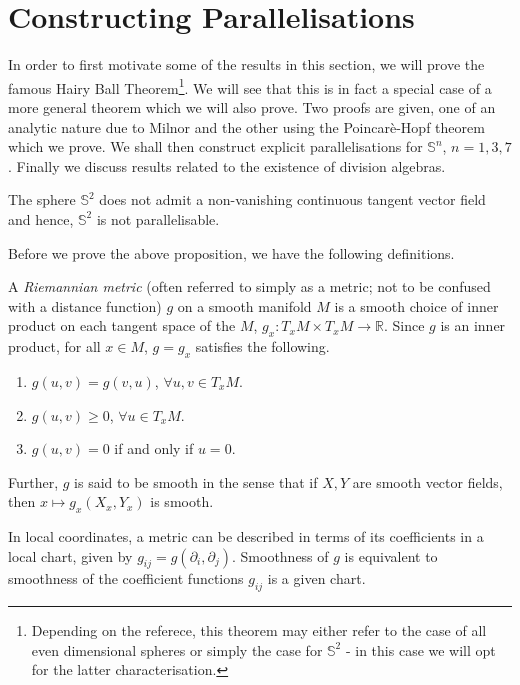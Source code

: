 \section{Constructing Parallelisations}
In order to first motivate some of the results in this section, we will prove the famous Hairy Ball Theorem\footnote{Depending on the referece, this theorem may either refer to the case of all even dimensional spheres or simply the case for $\mathbb{S}^2$ - in this case we will opt for the latter characterisation.}. We will see that this is in fact a special case of a more general theorem which we will also prove. Two proofs are given, one of an analytic nature due to Milnor \cite{MR505523} and the other using the Poincar\`{e}-Hopf theorem which we prove.
We shall then construct explicit parallelisations for $\mathbb{S}^n$, $n=1,3,7$. Finally we discuss results related to the existence of division algebras.
 
\begin{proposition}
The sphere $\mathbb{S}^2$ does not admit a non-vanishing continuous tangent vector field and hence, $\mathbb{S}^2$ is not parallelisable.
\end{proposition}

%
%
Before we prove the above proposition, we have the following definitions.

\begin{definition}
A \textit{Riemannian metric} (often referred to simply as a metric; not to be confused with a distance function) $g$ on a smooth manifold $M$ is a smooth choice of inner product on each tangent space of the $M$, $g_x:T_xM\times T_xM\to\mathbb{R}$. Since $g$ is an inner product, for all $x\in M$, $g=g_x$ satisfies the following.
\begin{enumerate}
\item $g(u,v)=g(v,u)$, $\forall u,v\in T_xM$.
\item $g(u,v)\geq 0$, $\forall u\in T_xM$.
\item $g(u,v)=0$ if and only if $u=0$.
\end{enumerate}
Further, $g$ is said to be smooth in the sense that if $X,Y$ are smooth vector fields, then $x\mapsto g_x(X_x,Y_x)$ is smooth.

In local coordinates, a metric can be described in terms of its coefficients in a local chart, given by $g_{ij}=g(\partial_i,\partial_j)$. Smoothness of $g$ is equivalent to smoothness of the coefficient functions $g_{ij}$ is a given chart.
\end{definition}

